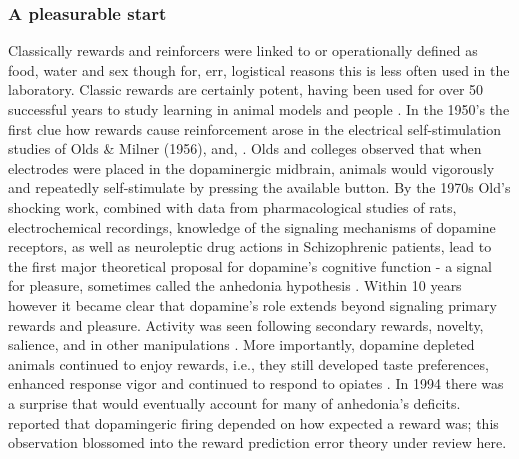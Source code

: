 \documentclass[doc,12pt]{apa}        %
\begin{document}
\subsubsection{A pleasurable start} %
\label{subsub:start}
Classically rewards and reinforcers were linked to or operationally defined as food, water \cite{ODoherty:2006p2875,schultz:2007aa} and sex though for, err, logistical reasons this is less often used in the laboratory.  Classic rewards are certainly potent, having been used for over 50 successful years to study learning in animal models \cite{iversen:2007aa} and people \cite{Kim:2010p7248,Montague:2006mz}.  In the 1950's the first clue how rewards cause reinforcement arose in the electrical self-stimulation studies of Olds \& Milner (1956), and, .  Olds and colleges observed that when electrodes were placed in the dopaminergic midbrain, animals would vigorously and repeatedly self-stimulate by pressing the available button.  By the 1970s Old's shocking work, combined with data from pharmacological studies of rats, electrochemical recordings, knowledge of the signaling mechanisms of dopamine receptors, as well as neuroleptic drug actions in Schizophrenic patients, lead to the first major theoretical proposal for dopamine's cognitive function - a signal for pleasure, sometimes called the anhedonia hypothesis \cite{Wise:1978p8771}.  Within 10 years however it became clear that dopamine's role extends beyond signaling primary rewards and pleasure. Activity was seen following secondary rewards, novelty, salience, and in other manipulations \cite{Spanagel:1999p8515, Salamone:2005p8774, BrombergMartin:2010p8834}.  More importantly, dopamine depleted animals continued to enjoy rewards, i.e., they still developed taste preferences, enhanced response vigor \cite{Cannon:2003p8513} and continued to respond to opiates \cite{Hnasko:2005p8832}.  In 1994 there was a surprise that would eventually account for many of anhedonia's deficits.   reported that dopamingeric firing depended on how expected a reward was; this observation blossomed into the reward prediction error theory under review here.
\end{document}
